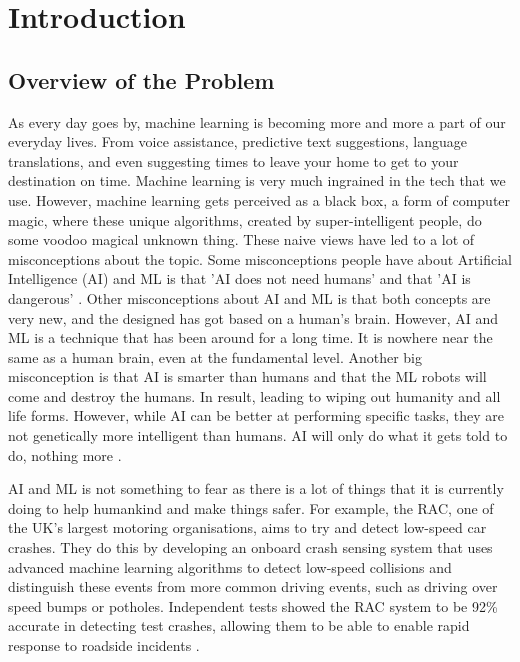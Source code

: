 \chapter{Introduction}
	\label{chap:intro}
	
	\section{Overview of the Problem}
		\label{sec:overview_of_problem}
		As every day goes by, machine learning is becoming more and more a part of our everyday lives. From voice assistance, predictive text suggestions, language translations, and even suggesting times to leave your home to get to your destination on time. Machine learning is very much ingrained in the tech that we use. However, machine learning gets perceived as a black box, a form of computer magic, where these unique algorithms, created by super-intelligent people, do some voodoo magical unknown thing. These naive views have led to a lot of misconceptions about the topic. Some misconceptions people have about Artificial Intelligence (AI) and ML is that 'AI does not need humans' and that 'AI is dangerous' \cite{quora5misconcepts}. Other misconceptions about AI and ML is that both concepts are very new, and the designed has got based on a human's brain. However, AI and ML is a technique that has been around for a long time. It is nowhere near the same as a human brain, even at the fundamental level. Another big misconception is that AI is smarter than humans and that the ML robots will come and destroy the humans. In result, leading to wiping out humanity and all life forms. However, while AI can be better at performing specific tasks, they are not genetically more intelligent than humans. AI will only do what it gets told to do, nothing more \cite{quora5misconcepts}.
		
		AI and ML is not something to fear as there is a lot of things that it is currently doing to help humankind and make things safer. For example, the RAC, one of the UK's largest motoring organisations, aims to try and detect low-speed car crashes. They do this by developing an onboard crash sensing system that uses advanced machine learning algorithms to detect low-speed collisions and distinguish these events from more common driving events, such as driving over speed bumps or potholes. Independent tests showed the RAC system to be 92\% accurate in detecting test crashes, allowing them to be able to enable rapid response to roadside incidents \cite{matlanintrotoml}.
	
